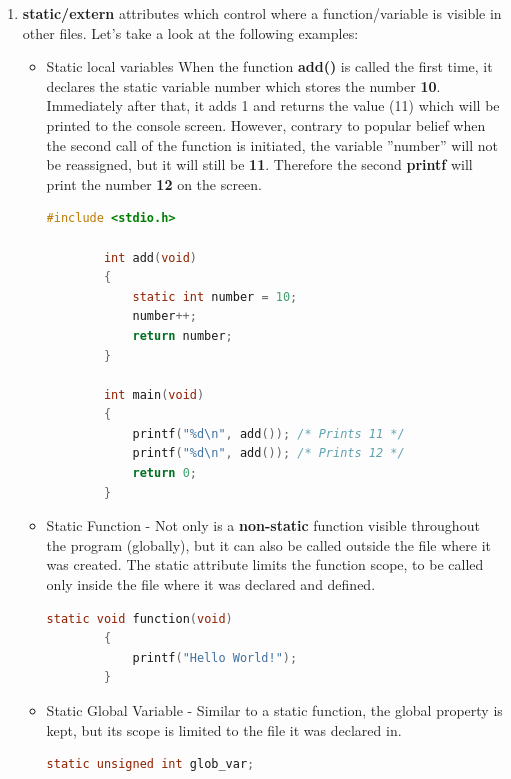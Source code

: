 \documentclass[12pt]{article}
\begin{document}
\begin{enumerate}
    \begin{lstlisting}[language=C]
        int factorial(int n) 
        {
            // Base case
            if (n == 0 || n == 1) 
                return 1;
            else
                // Recursive case: n! = n * (n-1)!
                return n * factorial(n - 1); 
        }
    \end{lstlisting}

    \item \textbf{static/extern} attributes which control where a function/variable is visible in other files. Let's take a look at the following examples:
    \begin{itemize}
        \item Static local variables \newline
        When the function \textbf{add()} is called the first time, it declares the static variable number which stores the number \textbf{10}. Immediately after that, it adds 1 and returns the value (11) which will be printed to the console screen. However, contrary to popular belief when the second call of the function is initiated, the variable ”number” will not be reassigned, but it will still be \textbf{11}. Therefore the second \textbf{printf} will print the number \textbf{12} on the screen. \newpage
        \begin{lstlisting}[language=C]
        #include <stdio.h>
        
        int add(void) 
        {
            static int number = 10;
            number++;
            return number;
        }
        
        int main(void) 
        {
            printf("%d\n", add()); /* Prints 11 */
            printf("%d\n", add()); /* Prints 12 */
            return 0;
        }
        \end{lstlisting}

        \item Static Function - Not only is a \textbf{non-static} function visible throughout the program (globally), but it can also be called outside the file where it was created. The static attribute limits the function scope, to be called only inside the file where it was declared and defined.
        \begin{lstlisting}[language=C]
        static void function(void)  
        {  
            printf("Hello World!");  
        }  
        \end{lstlisting}

        \item Static Global Variable - Similar to a static function, the global property is kept, but its scope is limited to the file it was declared in.
        \begin{lstlisting}[language=C]
        static unsigned int glob_var;
        \end{lstlisting}


\end{itemize}
\end{enumerate}
\end{document}

